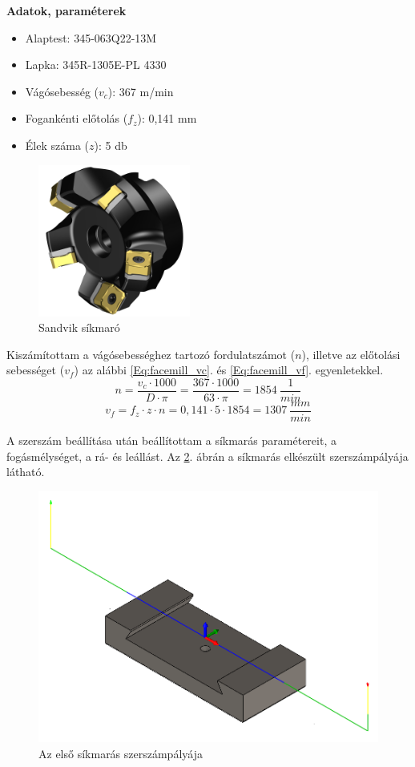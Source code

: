 \documentclass[12pt,a4paper,oneside]{report}
\begin{document}
\textbf{Adatok, paraméterek}
\begin{itemize}
    \item Alaptest: 345-063Q22-13M
    \item Lapka: 345R-1305E-PL 4330
    \item Vágósebesség ($v_c$): 367 m/min
    \item Fogankénti előtolás ($f_z$): 0,141 mm
    \item Élek száma ($z$): 5 db
\end{itemize}
\begin{figure}[H]
    \centering
    \includegraphics[width=5cm]{figures/facemill.jpg}
    \caption{Sandvik síkmaró}
    \label{Fig:facemill}
\end{figure}
Kiszámítottam a vágósebességhez tartozó fordulatszámot ($n$), illetve az előtolási sebességet ($v_f$) az alábbi \ref{Eq:facemill_vc}. és \ref{Eq:facemill_vf}. egyenletekkel.
\begin{equation}\label{Eq:facemill_vc}
    n=\dfrac{v_c\cdot1000}{D\cdot\pi}=\dfrac{367\cdot1000}{63\cdot\pi}=1854\ \dfrac{1}{min}
\end{equation}
\begin{equation}\label{Eq:facemill_vf}
    v_f=f_z\cdot z\cdot n=0,141\cdot5\cdot1854=1307\ \dfrac{mm}{min}
\end{equation}

A szerszám beállítása után beállítottam a síkmarás paramétereit, a fogásmélységet, a rá- és leállást. Az \ref{Fig:kemenypofa_facemill_1}. ábrán a síkmarás elkészült szerszámpályája látható.

\begin{figure}[H]
    \centering
    \includegraphics[width=12cm]{figures/kemenypofa_facemill_1.png}
    \caption{Az első síkmarás szerszámpályája}
    \label{Fig:kemenypofa_facemill_1}
\end{figure}
\end{document}
